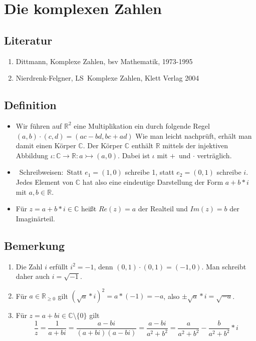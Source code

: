 \section{Die komplexen Zahlen}

\subsection{Literatur}
\begin{enumerate}
\item Dittmann, Komplexe Zahlen, bsv Mathematik, 1973-1995
\item Nierdrenk-Felgner, LS Komplexe Zahlen, Klett Verlag 2004
\end{enumerate}

\subsection{Definition}
\begin{itemize}
	\item Wir führen auf $\mathbb{R}^2$ eine Multiplikation ein durch folgende Regel $(a,b) \cdot (c,d) = (ac-bd, bc+ad)$
	Wie man leicht nachprüft, erhält man damit einen Körper $\mathbb{C}$.
	Der Körper $\mathbb{C}$ enthält $\mathbb{R}$ mittels der injektiven Abbildung $\iota: \mathbb{C} \rightarrow \mathbb{R}: a \rightarrowtail (a,0)$.
	Dabei ist $\iota$ mit $+$ und $\cdot$ verträglich.

	\item Schreibweisen: Statt $e_1 = (1,0)$ schreibe 1, statt $e_2 = (0,1)$ schreibe $i$.
	Jedes Element von $\mathbb{C}$ hat also eine eindeutige Darstellung der Form $a + b * i$ mit $a, b \in \mathbb{R}$.

	\item Für $z = a+b*i \in \mathbb{C}$ heißt $Re(z)=a$ der Realteil und $Im(z)=b$ der Imaginärteil.
\end{itemize}

\subsection{Bemerkung}
\begin{enumerate}
	\item Die Zahl $i$ erfüllt $i^2 = -1$, denn $(0,1) \cdot (0,1) = (-1,0)$.
	Man schreibt daher auch $i = \sqrt{-1}$.

	\item Für $a \in \mathbb{R}_{\geq 0}$ gilt $(\sqrt{a} * i)^2 = a * (-1) = -a$, also $\pm \sqrt{a} * i = \sqrt{-a}$.

	\item Für $z = a+bi \in \mathbb{C} \setminus \{0\}$ gilt
	\[\frac{1}{z} = \frac{1}{a+bi} = \frac{a-bi}{(a+bi)(a-bi)} = \frac{a-bi}{a^2+b^2} = \frac{a}{a^2+b^2} - \frac{b}{a^2+b^2} * i\]
\end{enumerate}

